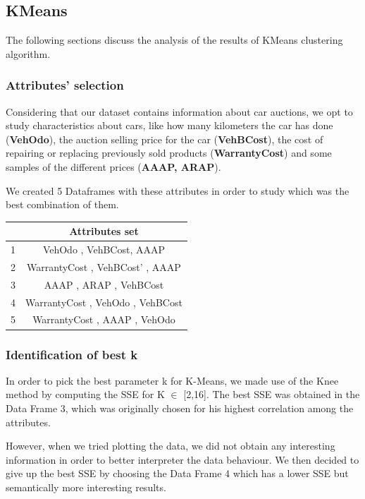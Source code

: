 \documentclass{article}
\begin{document}
	\subsection{KMeans}
	The following sections discuss the analysis of the results of KMeans clustering algorithm.
	
	\subsubsection{Attributes' selection}
	Considering that our dataset contains information about car auctions, we opt to study characteristics about cars, like how many kilometers the car has done (\textbf{VehOdo}), the auction selling price for the car (\textbf{VehBCost}), the cost of repairing or replacing previously sold products (\textbf{WarrantyCost}) and some samples of the different prices (\textbf{AAAP, ARAP}).
	
	We created 5 Dataframes with these attributes in order to study which was the best combination of them.
	
	\begin{table}[H]
		\centering
		\begin{tabular}{|c|c|}
			\hline
			& Attributes set \\
			\hline
			\rowcolor{Gray}
			1 & VehOdo ,  VehBCost,  AAAP \\
			2 & WarrantyCost , VehBCost' ,  AAAP  \\
			\rowcolor{Gray}
			3 & AAAP ,  ARAP ,  VehBCost \\
			4 & WarrantyCost ,  VehOdo ,  VehBCost  \\
			\rowcolor{Gray}
			5 & WarrantyCost ,  AAAP , VehOdo \\
			\hline
		\end{tabular}
	\end{table}
	
	
	\subsubsection{Identification of best k}
	
	
	In order to pick the best parameter k for K-Means, we made use of the Knee method by computing the SSE for K $\in$ [2,16]. The best SSE was obtained in the Data Frame 3, which was originally chosen for his highest correlation among the attributes.
	
	However, when we tried plotting the data, we did not obtain any interesting information in order to better interpreter the data behaviour. We then decided to give up the best SSE by choosing the Data Frame 4 which has a lower SSE but semantically more interesting results.
	
\end{document}

